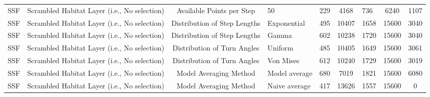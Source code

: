 \documentclass[10pt,a4paper]{article}
\begin{document}
\begin{table}
{\begin{tabular}[t]{lcclcclcc}
SSF & Scrambled Habitat Layer (i.e., No selection) & Available Points per Step & 50 & 229 & 4168 & 736 & 6240 & 1107\\
SSF & Scrambled Habitat Layer (i.e., No selection) & Distribution of Step Lengths & Exponential & 495 & 10407 & 1658 & 15600 & 3040\\
SSF & Scrambled Habitat Layer (i.e., No selection) & Distribution of Step Lengths & Gamma & 602 & 10238 & 1720 & 15600 & 3040\\
SSF & Scrambled Habitat Layer (i.e., No selection) & Distribution of Turn Angles & Uniform & 485 & 10405 & 1649 & 15600 & 3061\\
SSF & Scrambled Habitat Layer (i.e., No selection) & Distribution of Turn Angles & Von Mises & 612 & 10240 & 1729 & 15600 & 3019\\
SSF & Scrambled Habitat Layer (i.e., No selection) & Model Averaging Method & Model average & 680 & 7019 & 1821 & 15600 & 6080\\
SSF & Scrambled Habitat Layer (i.e., No selection) & Model Averaging Method & Naive average & 417 & 13626 & 1557 & 15600 & 0\\

\end{tabular}}
\end{table}
\end{document}
